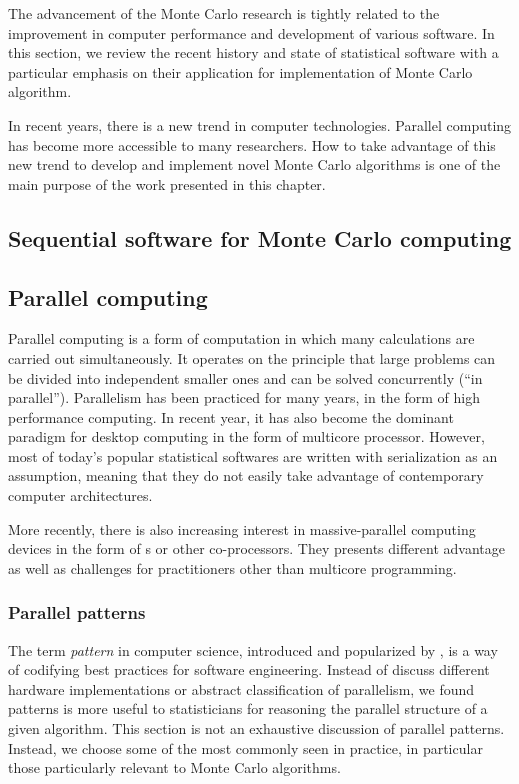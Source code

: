 The advancement of the Monte Carlo research is tightly related to the
improvement in computer performance and development of various software. In
this section, we review the recent history and state of statistical software
with a particular emphasis on their application for implementation of Monte
Carlo algorithm.

In recent years, there is a new trend in computer technologies. Parallel
computing has become more accessible to many researchers. How to take
advantage of this new trend to develop and implement novel Monte Carlo
algorithms is one of the main purpose of the work presented in this chapter.

\subsection{Sequential software for Monte Carlo computing}
\label{sub:Sequential software for Monte Carlo computing}

\subsection{Parallel computing}
\label{sub:Parallel computing}

Parallel computing is a form of computation in which many calculations are
carried out simultaneously. It operates on the principle that large problems
can be divided into independent smaller ones and can be solved concurrently
(``in parallel''). Parallelism has been practiced for many years, in the form
of high performance computing. In recent year, it has also become the dominant
paradigm for desktop computing in the form of multicore processor. However,
most of today's popular statistical softwares are written with serialization
as an assumption, meaning that they do not easily take advantage of
contemporary computer architectures.

More recently, there is also increasing interest in massive-parallel computing
devices in the form of \gpu{}s or other co-processors. They presents different
advantage as well as challenges for practitioners other than multicore
programming.

\subsubsection{Parallel patterns}
\label{ssub:Parallel patterns}

The term \emph{pattern} in computer science, introduced and popularized by
\cite{GangOfFour}, is a way of codifying best practices for software
engineering. Instead of discuss different hardware implementations or abstract
classification of parallelism, we found patterns is more useful to
statisticians for reasoning the parallel structure of a given algorithm. This
section is not an exhaustive discussion of parallel patterns. Instead, we
choose some of the most commonly seen in practice, in particular those
particularly relevant to Monte Carlo algorithms.

